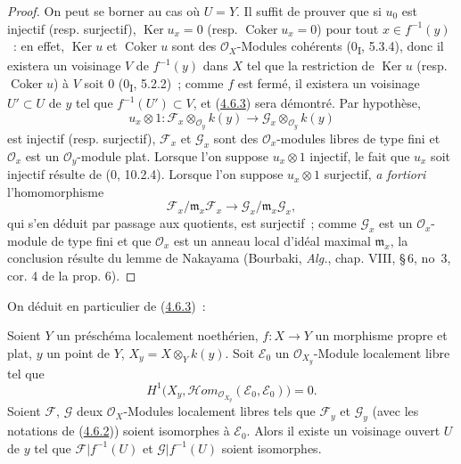 \begin{proof}
On peut se borner au cas où $U=Y$. Il suffit de prouver que si $u_0$ est
injectif (resp. surjectif), $\operatorname{Ker}u_x=0$ (resp.
$\operatorname{Coker}u_x=0$) pour tout $x\in f^{-1}(y)$~: en effet,
$\operatorname{Ker}u$ et $\operatorname{Coker}u$ sont des
$\mathcal O_X$-Modules cohérents (0\textsubscript{I}, 5.3.4), donc il
existera un voisinage $V$ de $f^{-1}(y)$ dans $X$ tel que la restriction de
$\operatorname{Ker}u$ (resp. $\operatorname{Coker}u$) à $V$ soit $0$
(0\textsubscript{I}, 5.2.2)~; comme $f$ est fermé, il existera un voisinage
$U'\subset U$ de $y$ tel que $f^{-1}(U')\subset V$, et
(\hyperref[III.4.6.3-fr]{4.6.3}) sera démontré. Par hypothèse,
\[
u_x\otimes1:
\mathcal F_x\otimes_{\mathcal O_y}k(y)
\longrightarrow
\mathcal G_x\otimes_{\mathcal O_y}k(y)
\]
est injectif (resp. surjectif), $\mathcal F_x$ et $\mathcal G_x$ sont des
$\mathcal O_x$-modules libres de type fini et $\mathcal O_x$ est un
$\mathcal O_y$-module plat. Lorsque l'on suppose $u_x\otimes1$ injectif, le
fait que $u_x$ soit injectif résulte de (0, 10.2.4). Lorsque l'on suppose
$u_x\otimes1$ surjectif, \emph{a fortiori} l'homomorphisme
\[
\mathcal F_x/\mathfrak m_x\mathcal F_x
\longrightarrow
\mathcal G_x/\mathfrak m_x\mathcal G_x,
\]
qui s'en déduit par passage aux quotients, est surjectif~; comme
$\mathcal G_x$ est un $\mathcal O_x$-module de type fini et que
$\mathcal O_x$ est un anneau local d'idéal maximal $\mathfrak m_x$, la
conclusion résulte du lemme de Nakayama (Bourbaki, \emph{Alg.}, chap. VIII,
\S\,6, no~3, cor. 4 de la prop. 6).
\end{proof}

On déduit en particulier de (\hyperref[III.4.6.3-fr]{4.6.3})~:

\begin{corollary}[4.6.4]
\label{III.4.6.4-fr}
Soient $Y$ un préschéma localement noethérien, $f:X\to Y$ un morphisme propre
et plat, $y$ un point de $Y$, $X_y=X\otimes_Yk(y)$. Soit $\mathcal E_0$ un
$\mathcal O_{X_y}$-Module localement libre tel que
\[
\label{III.4.6.4.1-fr}
H^1\bigl(X_y,
\mathcal{H}\!om_{\mathcal O_{X_y}}(\mathcal E_0,\mathcal E_0)\bigr)=0.
\tag{4.6.4.1}
\]
Soient $\mathcal F$, $\mathcal G$ deux $\mathcal O_X$-Modules localement
libres tels que $\mathcal F_y$ et $\mathcal G_y$ (avec les notations de
(\hyperref[III.4.6.2-fr]{4.6.2})) soient isomorphes à $\mathcal E_0$. Alors
il existe un voisinage ouvert $U$ de $y$ tel que $\mathcal F|f^{-1}(U)$ et
$\mathcal G|f^{-1}(U)$ soient isomorphes.
\end{corollary}

